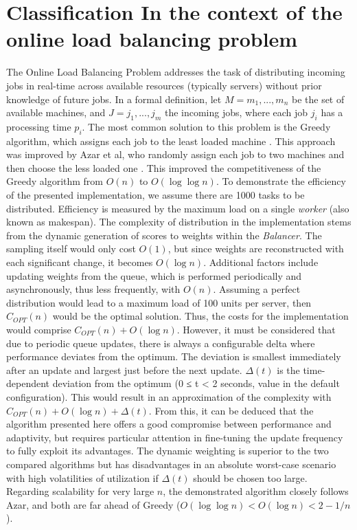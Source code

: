 \documentclass[twocolumn]{webofc}
\begin{document}
\section{Classification In the context of the online load balancing problem}
The Online Load Balancing Problem addresses the task of distributing incoming jobs in real-time across available resources (typically servers) without prior knowledge of future jobs. In a formal definition, let \( M = {m_1, ..., m_n} \) be the set of available machines, and \( J = {j_1, ..., j_m} \) the incoming jobs, where each job $j_i$ has a processing time $p_i$. The most common solution to this problem is the Greedy algorithm, which assigns each job to the least loaded machine \cite{black2020greedy}. This approach was improved by Azar et al, who randomly assign each job to two machines and then choose the less loaded one \cite{AZAR199473}. This improved the competitiveness of the Greedy algorithm from $O(n)$ to $O(\log \log n)$. To demonstrate the efficiency of the presented implementation, we assume there are 1000 tasks to be distributed. Efficiency is measured by the maximum load on a single \textit{worker} (also known as makespan). The complexity of distribution in the implementation stems from the dynamic generation of scores to weights within the \textit{Balancer}. The sampling itself would only cost $O(1)$, but since weights are reconstructed with each significant change, it becomes $O(\log n)$. Additional factors include updating weights from the queue, which is performed periodically and asynchronously, thus less frequently, with $O(n)$. Assuming a perfect distribution would lead to a maximum load of 100 units per server, then $C_{OPT}(n)$ would be the optimal solution. Thus, the costs for the implementation would comprise $C_{OPT}(n) + O(\log n)$. However, it must be considered that due to periodic queue updates, there is always a configurable delta where performance deviates from the optimum. The deviation is smallest immediately after an update and largest just before the next update. $\Delta(t)$ is the time-dependent deviation from the optimum (0 ≤ t < 2 seconds, value in the default configuration). This would result in an approximation of the complexity with $C_{OPT}(n) + O(\log n) + \Delta(t)$. From this, it can be deduced that the algorithm presented here offers a good compromise between performance and adaptivity, but requires particular attention in fine-tuning the update frequency to fully exploit its advantages. The dynamic weighting is superior to the two compared algorithms but has disadvantages in an absolute worst-case scenario with high volatilities of utilization if $\Delta(t)$ should be chosen too large. Regarding scalability for very large $n$, the demonstrated algorithm closely follows Azar, and both are far ahead of Greedy ($O(\log \log n) < O(\log n) < 2 - 1/n$).
\end{document}
